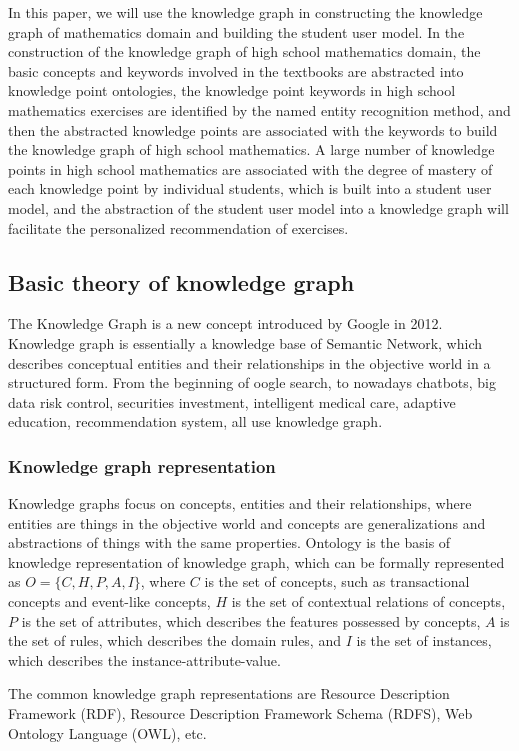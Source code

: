 \documentclass[11pt,en]{elegantpaper}
\begin{document}
In this paper, we will use the knowledge graph in constructing the knowledge graph of mathematics domain and building the student user model. In the construction of the knowledge graph of high school mathematics domain, the basic concepts and keywords involved in the textbooks are abstracted into knowledge point ontologies, the knowledge point keywords in high school mathematics exercises are identified by the named entity recognition method, and then the abstracted knowledge points are associated with the keywords to build the knowledge graph of high school mathematics. A large number of knowledge points in high school mathematics are associated with the degree of mastery of each knowledge point by individual students, which is built into a student user model, and the abstraction of the student user model into a knowledge graph will facilitate the personalized recommendation of exercises.

\subsection{Basic theory of knowledge graph}
The Knowledge Graph is a new concept introduced by Google in 2012. Knowledge graph is essentially a knowledge base of Semantic Network, which describes conceptual entities and their relationships in the objective world in a structured form. From the beginning of oogle search, to nowadays chatbots, big data risk control, securities investment, intelligent medical care, adaptive education, recommendation system, all use knowledge graph.
\subsubsection{Knowledge graph representation}
Knowledge graphs focus on concepts, entities and their relationships, where entities are things in the objective world and concepts are generalizations and abstractions of things with the same properties. Ontology is the basis of knowledge representation of knowledge graph, which can be formally represented as $O=\{C,H,P,A,I\}$, where $C$ is the set of concepts, such as transactional concepts and event-like concepts, $H$ is the set of contextual relations of concepts, $P$ is the set of attributes, which describes the features possessed by concepts, $A$ is the set of rules, which describes the domain rules, and $I$ is the set of instances, which describes the instance-attribute-value.

The common knowledge graph representations are Resource Description Framework (RDF), Resource Description Framework Schema (RDFS), Web Ontology Language (OWL), etc.
\end{document}
